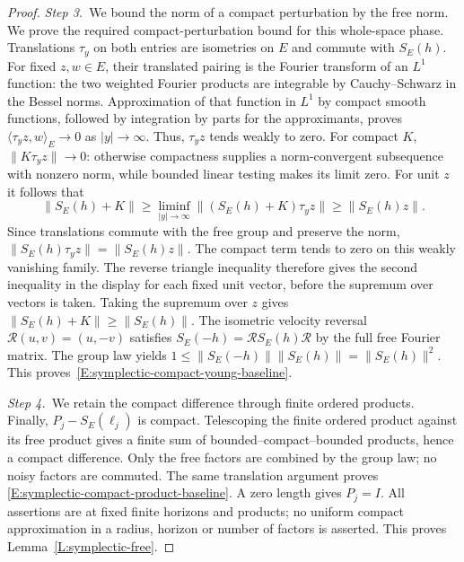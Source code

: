 \begin{proof}
  \medskip
  \noindent\textit{Step 3.~}We bound the norm of a compact perturbation by the
  free norm.
  We prove the required compact-perturbation bound for this whole-space phase.
  Translations $\tau_y$ on both entries are isometries on $E$ and commute with
  $S_E(h)$. For fixed $z,w \in E$, their translated pairing is the Fourier
  transform of an $L^1$ function: the two weighted Fourier products are
  integrable by Cauchy--Schwarz in the Bessel norms. Approximation of that
  function in $L^1$ by compact smooth functions, followed by integration by
  parts for the approximants, proves $\langle\tau_yz,w\rangle_E \to 0$ as $|y|
  \to \infty$. Thus, $\tau_yz$ tends weakly to zero. For compact $K$,
  $\|K\tau_yz\| \to 0$: otherwise compactness supplies a norm-convergent
  subsequence with nonzero norm, while bounded linear testing makes its limit
  zero. For unit $z$ it follows that
  \[
    \|S_E(h)+K\|
    \ge\liminf_{|y|\to\infty}\|(S_E(h)+K)\tau_yz\|
    \ge\|S_E(h)z\|.
  \]
  Since translations commute with the free group and preserve the norm,
  $\|S_E(h)\tau_yz\|=\|S_E(h)z\|$. The compact term tends to zero on this
  weakly vanishing family. The reverse triangle inequality therefore gives the
  second inequality in the display for each fixed unit vector, before the
  supremum over vectors is taken.
  Taking the supremum over $z$ gives $\|S_E(h)+K\| \ge \|S_E(h)\|$. The
  isometric velocity reversal $\mathcal{R}(u,v) = (u,-v)$ satisfies $S_E(-h) =
  \mathcal{R} S_E(h)\mathcal{R}$ by the full free Fourier matrix. The group law
  yields $1 \le \|S_E(-h)\|\|S_E(h)\| = \|S_E(h)\|^2$. This
  proves~\eqref{E:symplectic-compact-young-baseline}.


  \medskip
  \noindent\textit{Step 4.~}We retain the compact difference through finite
  ordered products.
  Finally, $P_j-S_E(\ell_j)$ is compact. Telescoping the finite ordered product
  against its free product gives a finite sum of bounded--compact--bounded
  products, hence a compact difference. Only the free factors are combined by
  the group law; no noisy factors are commuted. The same translation argument
  proves \eqref{E:symplectic-compact-product-baseline}. A zero length gives $P_j
  = I$. All assertions are at fixed finite horizons and products; no uniform
  compact approximation in a radius, horizon or number of factors is asserted.
  This proves Lemma~\ref{L:symplectic-free}.
\end{proof}

